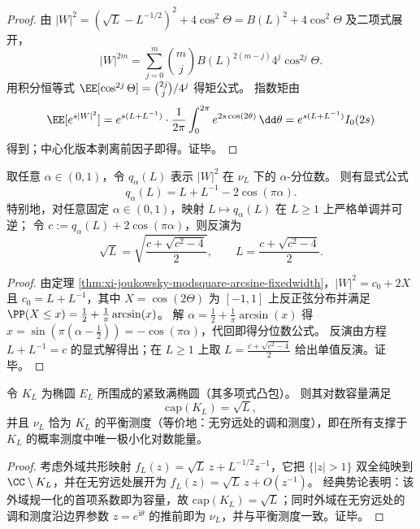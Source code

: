 \begin{proof}
由 \(|W|^2=(\sqrt{L}-L^{-1/2})^2+4\cos^2\Theta=B(L)^2+4\cos^2\Theta\) 及二项式展开，
\[
|W|^{2m}=\sum_{j=0}^{m}\binom{m}{j}B(L)^{2(m-j)}4^j\cos^{2j}\Theta.
\]
用积分恒等式 \(\EE[\cos^{2j}\Theta]=\binom{2j}{j}/4^j\) 得矩公式。
指数矩由
\[
\EE[e^{s|W|^2}]
=e^{s(L+L^{-1})}\cdot \frac{1}{2\pi}\int_{0}^{2\pi}e^{2s\cos(2\theta)}\,\dd\theta
=e^{s(L+L^{-1})}I_0(2s)
\]
得到；中心化版本剥离前因子即得。证毕。
\end{proof}

\begin{proposition}\label{prop:xi-joukowsky-modsquare-quantile-inversion}
取任意 \(\alpha\in(0,1)\)，令 \(q_\alpha(L)\) 表示 \(|W|^2\) 在 \(\nu_L\) 下的 \(\alpha\)-分位数。
则有显式公式
\[
q_\alpha(L)=L+L^{-1}-2\cos(\pi\alpha).
\]
特别地，对任意固定 \(\alpha\in(0,1)\)，映射 \(L\mapsto q_\alpha(L)\) 在 \(L\ge 1\) 上严格单调并可逆；
令 \(c:=q_\alpha(L)+2\cos(\pi\alpha)\)，则反演为
\[
\sqrt{L}=\sqrt{\frac{c+\sqrt{c^2-4}}{2}},
\qquad
L=\frac{c+\sqrt{c^2-4}}{2}.
\]
\end{proposition}

\begin{proof}
由定理 \ref{thm:xi-joukowsky-modsquare-arcsine-fixedwidth}，\(|W|^2=c_0+2X\) 且 \(c_0=L+L^{-1}\)，其中 \(X=\cos(2\Theta)\) 为 \([-1,1]\) 上反正弦分布并满足
\(
\PP(X\le x)=\frac12+\frac{1}{\pi}\arcsin(x)
\)。
解 \(\alpha=\frac12+\frac{1}{\pi}\arcsin(x)\) 得 \(x=\sin(\pi(\alpha-\tfrac12))=-\cos(\pi\alpha)\)，代回即得分位数公式。
反演由方程 \(L+L^{-1}=c\) 的显式解得出；在 \(L\ge 1\) 上取 \(L=\frac{c+\sqrt{c^2-4}}{2}\) 给出单值反演。证毕。
\end{proof}

\begin{theorem}\label{thm:xi-joukowsky-capacity-equilibrium-measure}
令 \(K_L\) 为椭圆 \(E_L\) 所围成的紧致满椭圆（其多项式凸包）。
则其对数容量满足
\[
\mathrm{cap}(K_L)=\sqrt{L},
\]
并且 \(\nu_L\) 恰为 \(K_L\) 的平衡测度（等价地：无穷远处的调和测度），即在所有支撑于 \(K_L\) 的概率测度中唯一极小化对数能量。
\end{theorem}

\begin{proof}
考虑外域共形映射 \(f_L(z)=\sqrt{L}\,z+L^{-1/2}z^{-1}\)，它把 \(\{|z|>1\}\) 双全纯映到 \(\CC\setminus K_L\)，并在无穷远处展开为 \(f_L(z)=\sqrt{L}\,z+O(z^{-1})\)。
经典势论表明：该外域规一化的首项系数即为容量，故 \(\mathrm{cap}(K_L)=\sqrt{L}\)；同时外域在无穷远处的调和测度沿边界参数 \(z=e^{\mathrm{i}\theta}\) 的推前即为 \(\nu_L\)，并与平衡测度一致。证毕。
\end{proof}

